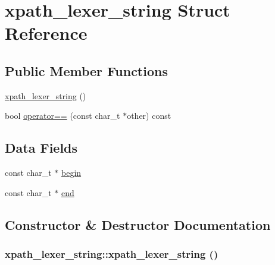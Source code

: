 \hypertarget{structxpath__lexer__string}{
\section{xpath\_\-lexer\_\-string Struct Reference}
\label{structxpath__lexer__string}
}
\subsection*{Public Member Functions}
\begin{CompactItemize}
\item 
\hyperlink{structxpath__lexer__string_3e60ca9bfea3cf907582eb527479e304}{xpath\_\-lexer\_\-string} ()
\item 
bool \hyperlink{structxpath__lexer__string_c19adfd75832be8eff3f430aa3cb3c14}{operator==} (const char\_\-t $\ast$other) const 
\end{CompactItemize}
\subsection*{Data Fields}
\begin{CompactItemize}
\item 
const char\_\-t $\ast$ \hyperlink{structxpath__lexer__string_0b985863d7363a75d4fdd0a7ece1fca0}{begin}
\item 
const char\_\-t $\ast$ \hyperlink{structxpath__lexer__string_13bbedeca2f8c2fb1e294325eea66878}{end}
\end{CompactItemize}


\subsection{Constructor \& Destructor Documentation}
\hypertarget{structxpath__lexer__string_3e60ca9bfea3cf907582eb527479e304}{
\subsubsection[xpath\_\-lexer\_\-string]{\setlength{\rightskip}{0pt plus 5cm}xpath\_\-lexer\_\-string::xpath\_\-lexer\_\-string ()}}
\label{structxpath__lexer__string_3e60ca9bfea3cf907582eb527479e304}




